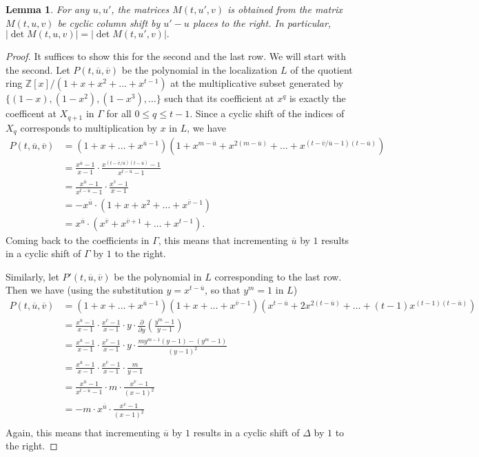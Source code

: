 \documentclass[12pt,a4paper]{article}
\newtheorem{lemma}[theorem]{Lemma}
\newcommand{\Z}{\mathbb{Z}}
\newcommand{\uo}{\overline{u}}
\newcommand{\vo}{\overline{v}}
\begin{document}
\begin{lemma}\label{shift}
For any $u,u'$, the matrices $M(t,u',v)$ is obtained from the matrix $M(t,u,v)$ be cyclic column shift by $u'-u$ places to the right. In particular, $|\det M(t,u,v)|=|\det M(t,u',v)|.$
\end{lemma}
\begin{proof}
It suffices to show this for the second and the last row. We will start with the second. Let $P(t,\uo,\vo)$ be the polynomial in the localization $L$ of the quotient ring $\Z[x]/(1+x+x^2+\dots+x^{t-1})$ at the multiplicative subset generated by $\{(1-x),(1-x^2),(1-x^3),\dots\}$ such that its coefficient at $x^q$ is exactly the coefficent at $X_{q+1}$ in $\Gamma$ for all $0\leq q \leq t-1$. Since a cyclic shift of the indices of $X_q$ corresponds to multiplication by $x$ in $L$, we have
\begin{equation}\label{Gamma}
\begin{split}
P(t,\uo,\vo)&=(1+x+\dots+x^{\uo-1})(1+x^{m-\uo}+x^{2(m-\uo)}+\dots+x^{(t-\vo/\uo-1)(t-\uo)})\\
&=\frac{x^{\uo}-1}{x-1}\cdot \frac{x^{(t-\vo/\uo)(t-\uo)}-1}{x^{t-\uo}-1}\\
&=\frac{x^{\uo}-1}{x^{t-\uo}-1}\cdot \frac{x^{\vo}-1}{x-1}\\
&=-x^{\uo}\cdot (1+x+x^2+\dots+x^{\vo-1})\\
&=x^{\uo}\cdot (x^{\vo}+x^{\vo+1}+\dots+x^{t-1}).
\end{split}
\end{equation}
Coming back to the coefficients in $\Gamma$, this means that %
incrementing $\uo$ by $1$ results in a cyclic shift of $\Gamma$ by $1$ to the right.

Similarly, let $P'(t,\uo,\vo)$ be the polynomial in $L$ corresponding to the last row. Then we have (using the substitution $y=x^{t-\uo}$, so that $y^m=1$ in $L$)
\begin{equation}\label{Delta}
\begin{split}
P(t,\uo,\vo)&=(1+x+\dots+x^{\uo-1})(1+x+\dots+x^{\vo-1})(x^{t-\uo}+2x^{2(t-\uo)}+\dots+(t-1)x^{(t-1)(t-\uo)})\\
&=\frac{x^{\uo}-1}{x-1}\cdot \frac{x^{\vo}-1}{x-1}\cdot y \cdot \frac{\partial}{\partial y} \left(\frac{y^{m}-1}{y-1}\right)\\
&=\frac{x^{\uo}-1}{x-1}\cdot \frac{x^{\vo}-1}{x-1}\cdot y \cdot \frac{my^{m-1}(y-1)-(y^m-1)}{(y-1)^2}\\
&=\frac{x^{\uo}-1}{x-1}\cdot \frac{x^{\vo}-1}{x-1} \cdot \frac{m}{y-1}\\
&=\frac{x^{\uo}-1}{x^{t-\uo}-1}\cdot m\cdot\frac{x^{\vo}-1}{(x-1)^2}\\
&=-m\cdot x^{\uo}\cdot\frac{x^{\vo}-1}{(x-1)^2}\\
\end{split}
\end{equation}
Again, this means that incrementing $\uo$ by $1$ results in a cyclic shift of $\Delta$ by $1$ to the right.
\end{proof}
\end{document}
